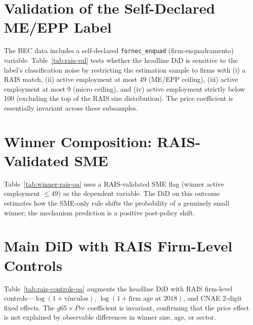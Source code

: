 \documentclass[12pt]{article}
\begin{document}
\section{Validation of the Self-Declared ME/EPP Label}

The BEC data includes a self-declared \texttt{fornec\_enquad} (firm-enquadramento) variable. Table~\ref{tab:rais-val} tests whether the headline DiD is sensitive to the label's classification noise by restricting the estimation sample to firms with (i) a RAIS match, (ii) active employment at most 49 (ME/EPP ceiling), (iii) active employment at most 9 (micro ceiling), and (iv) active employment strictly below 100 (excluding the top of the RAIS size distribution). The price coefficient is essentially invariant across these subsamples.


\section{Winner Composition: RAIS-Validated SME}

Table~\ref{tab:winner-rais-oa} uses a RAIS-validated SME flag (winner active employment $\leq 49$) as the dependent variable. The DiD on this outcome estimates how the SME-only rule shifts the probability of a genuinely small winner; the mechanism prediction is a positive post-policy shift.



\section{Main DiD with RAIS Firm-Level Controls}

Table~\ref{tab:rais-controls-oa} augments the headline DiD with RAIS firm-level controls---$\log(1+\text{v\'inculos})$, $\log(1+\text{firm age at 2018})$, and CNAE 2-digit fixed effects. The $g65 \times Pre$ coefficient is invariant, confirming that the price effect is not explained by observable differences in winner size, age, or sector.
\end{document}
